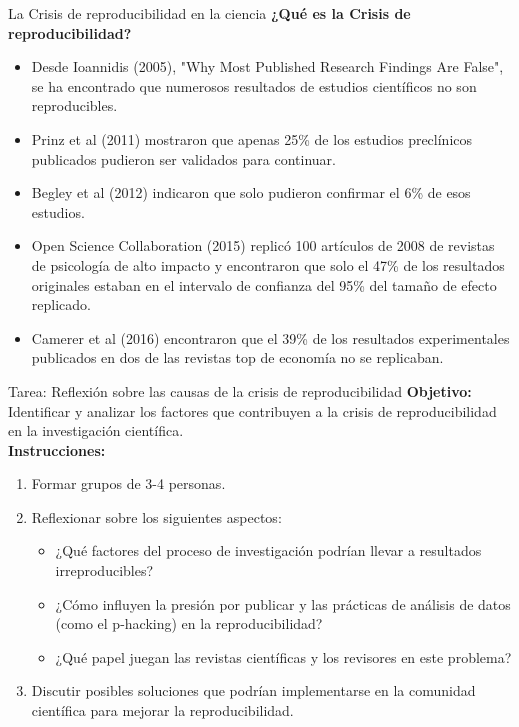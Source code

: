 ﻿\documentclass{beamer}
\begin{document}
\begin{frame}{La Crisis de reproducibilidad en la ciencia}
\textbf{¿Qué es la Crisis de reproducibilidad?}
\begin{itemize}
    \item Desde Ioannidis (2005), "Why Most Published Research Findings Are False", se ha encontrado que numerosos resultados de estudios científicos no son reproducibles.
    \item Prinz et al (2011) mostraron que apenas 25\% de los estudios preclínicos publicados pudieron ser validados para continuar.
    \item Begley et al (2012) indicaron que solo pudieron confirmar el 6\% de esos estudios.   
    \item Open Science Collaboration (2015) replicó 100 artículos de 2008 de revistas de psicología de alto impacto y encontraron que solo el 47\% de los resultados originales estaban en el intervalo de confianza del 95\% del tamaño de efecto replicado.
    \item Camerer et al (2016) encontraron que el 39\% de los resultados experimentales publicados en dos de las revistas top de economía no se replicaban.
\end{itemize}
\end{frame}

\begin{frame}{Tarea: Reflexión sobre las causas de la crisis de reproducibilidad}
\textbf{Objetivo:} Identificar y analizar los factores que contribuyen a la crisis de reproducibilidad en la investigación científica.\\[10pt]
\textbf{Instrucciones:}
\begin{enumerate}
    \item Formar grupos de 3-4 personas.
    \item Reflexionar sobre los siguientes aspectos:
    \begin{itemize}
        \item ¿Qué factores del proceso de investigación podrían llevar a resultados irreproducibles?
        \item ¿Cómo influyen la presión por publicar y las prácticas de análisis de datos (como el p-hacking) en la reproducibilidad?
        \item ¿Qué papel juegan las revistas científicas y los revisores en este problema?
    \end{itemize}
    \item Discutir posibles soluciones que podrían implementarse en la comunidad científica para mejorar la reproducibilidad.
\end{enumerate}
\end{frame}
\end{document}
